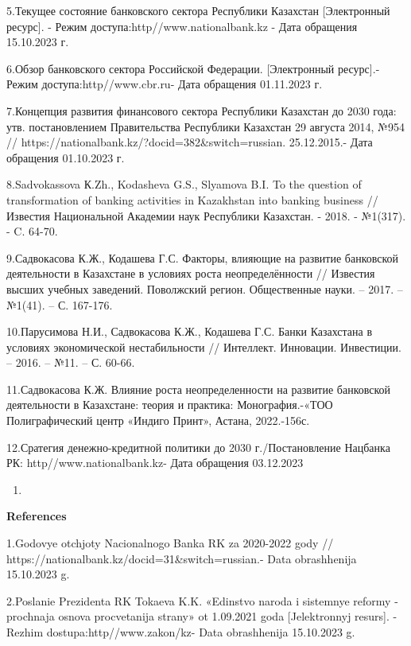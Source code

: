 5.Текущее состояние банковского сектора Республики Казахстан
{[}Электронный ресурс{]}. - Режим доступа:http//www.nationalbank.kz -
Дата обращения 15.10.2023 г.

6.Обзор банковского сектора Российской Федерации. {[}Электронный
ресурс{]}.- Режим доступа:http//www.cbr.ru- Дата обращения 01.11.2023 г.

7.Концепция развития финансового сектора Республики Казахстан до 2030
года: утв. постановлением Правительства Республики Казахстан 29 августа
2014, №954 // https://nationalbank.kz/?docid=382\&switch=russian.
25.12.2015.- Дата обращения 01.10.2023 г.

8.Sadvokassova К.Zh., Kodasheva G.S., Slyamova B.I. To the question of
transformation of banking activities in Kazakhstan into banking business
// Известия Национальной Академии наук Республики Казахстан. - 2018. -
№1(317). - C. 64-70.

9.Садвокасова К.Ж., Кодашева Г.С. Факторы, влияющие на развитие
банковской деятельности в Казахстане в условиях роста неопределённости
// Известия высших учебных заведений. Поволжский регион. Общественные
науки. -- 2017. -- №1(41). -- С. 167-176.

10.Парусимова Н.И., Садвокасова К.Ж., Кодашева Г.С. Банки Казахстана в
условиях экономической нестабильности // Интеллект. Инновации.
Инвестиции. -- 2016. -- №11. -- С. 60-66.

11.Садвокасова К.Ж. Влияние роста неопределенности на развитие
банковской деятельности в Казахстане: теория и практика:
Монография.-«ТОО Полиграфический центр «Индиго Принт», Астана,
2022.-156с.

12.Сратегия денежно-кредитной политики до 2030 г./Постановление Нацбанка
РК: http//www.nationalbank.kz- Дата обращения 03.12.2023

\begin{enumerate}
\def\labelenumi{\arabic{enumi}.}

\item
\end{enumerate}

{\bfseries References}

1.Godovye otchjoty Nacional\textquotesingle nogo Banka RK za 2020-2022
gody // https://nationalbank.kz/docid=31\&switch=russian.- Data
obrashhenija 15.10.2023 g.

2.Poslanie Prezidenta RK Tokaeva K.K. «Edinstvo naroda i sistemnye
reformy - prochnaja osnova procvetanija strany» ot 1.09.2021 goda
{[}Jelektronnyj resurs{]}. - Rezhim dostupa:http//www.zakon/kz- Data
obrashhenija 15.10.2023 g.

